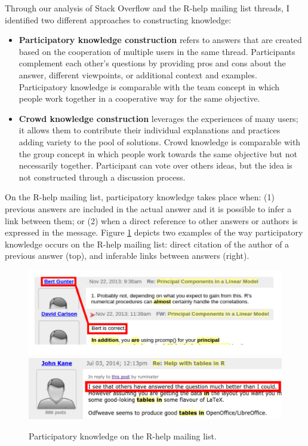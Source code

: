 \documentclass{sig-alternate-05-2015}
\begin{document}

	Through our analysis of Stack Overflow and the R-help mailing list threads, I identified two different approaches to constructing knowledge:
	\begin{itemize}
		\item \textbf{Participatory knowledge construction} refers to answers that are created based on the cooperation of multiple users in the same thread.
		Participants complement each other's questions by providing pros and cons about the answer, different viewpoints, or additional context and examples.
		Participatory knowledge is comparable with the team concept in which people work together in a cooperative way for the same objective.

		\item \textbf{Crowd knowledge construction} leverages the experiences of many users; it allows them to contribute their individual explanations and practices adding variety to the pool of solutions.
		Crowd knowledge is comparable with the group concept in which people work towards the same objective but not necessarily together. Participant can vote over others ideas, but the idea is not constructed through a discussion process.
	\end{itemize}

	On the R-help mailing list, participatory knowledge takes place when:
	(1) previous answers are included in the actual answer and it is possible to infer a link between them; or
	(2) when a direct reference to other answers or authors is expressed in the message.
	Figure \ref{fig:ML-PK1} depicts two examples of the way participatory knowledge occurs on the R-help mailing list:
	direct citation of the author of a previous answer (top), and inferable links between answers (right).

	
	\begin{figure}[!htb]
		\centering
		\includegraphics[width=0.8\columnwidth]{Figures/ML-PKimg2}
		\includegraphics[width=0.8\columnwidth]{Figures/ML-PKimg11}
		\caption[Participatory knowledge on the R-help mailing list.]{Participatory knowledge on the R-help mailing list.}
		\label{fig:ML-PK1}
	\end{figure}
\end{document}
